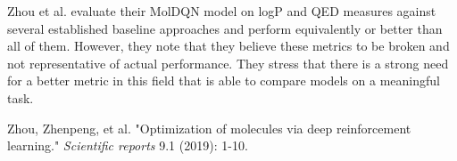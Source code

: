 \documentclass[12pt]{article}
\begin{document}
Zhou et al. evaluate their MolDQN model on logP and QED measures against several established baseline approaches and perform equivalently or better than all of them. However, they note that they believe these metrics to be broken and not representative of actual performance. They stress that there is a strong need for a better metric in this field that is able to compare models on a meaningful task.

\begin{thebibliography}{9}
Zhou, Zhenpeng, et al. "Optimization of molecules via deep reinforcement learning." \emph{Scientific reports} 9.1 (2019): 1-10.

\end{thebibliography}
\end{document}
